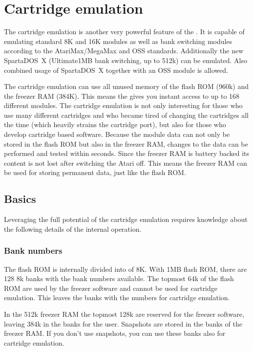 \chapter{Cartridge emulation}
\label{chap:cartemu}
The cartridge emulation is another very powerful feature of the \frz.
It is capable of emulating standard 8K and 16K modules as well as bank switching
modules according to the AtariMax/MegaMax and OSS standards. Additionally the
new\linebreak
SpartaDOS~X (Ultimate1MB bank switching, up to 512k) can be emulated.
Also combined usage of SpartaDOS~X together with an OSS module is allowed.

The cartridge emulation can use all unused memory of the flash ROM (960k) and
the freezer RAM (384K). This means the \frz gives you instant access to up to
168 different modules.
The cartridge emulation is not only interesting for those who use many different
cartridges and who became tired of changing the cartridges all the time (which
heavily strains the cartridge port), but also for those who develop cartridge
based software.
Because the module data can not only be stored in the flash ROM but also in the
freezer RAM, changes to the data can be performed and tested within seconds.
Since the freezer RAM is battery backed its content is not lost after
switching the Atari off. This means the freezer RAM can be used for storing
permanent data, just like the flash ROM.

\section{Basics}
Leveraging the full potential of the cartridge emulation requires knowledge
about the following details of the internal operation.

\subsection{Bank numbers}

The flash ROM is internally divided into  of 8K.
With 1MB flash ROM, there are 128 8k banks with the bank numbers
 available. The topmost 64k of the flash ROM are used by the
freezer software and cannot be used for cartridge emulation. This leaves the banks with the numbers
 for cartridge emulation.

In the 512k freezer RAM the topmost 128k are reserved for the freezer software,
leaving 384k in the banks for the user. Snapshots are stored in the
banks  of the freezer RAM. If you don't use snapshots, you can
use these banks also for cartridge emulation.


